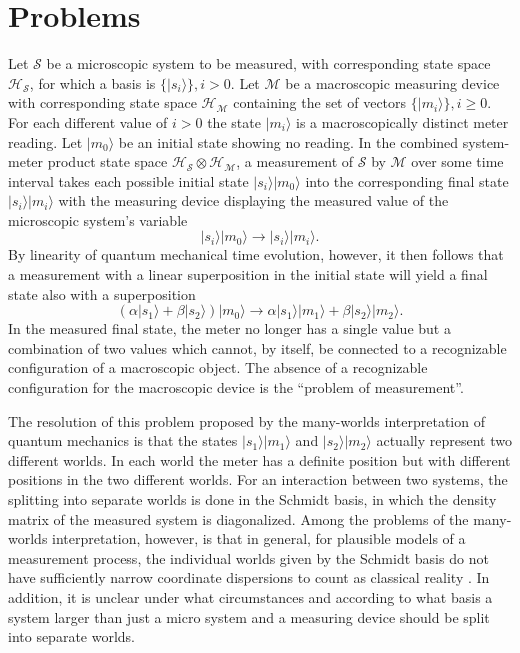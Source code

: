 \documentclass[twocolumn,amsmath,amssymb]{revtex4-1}
\begin{document}
\section{\label{sec:problems}Problems}
Let $\mathcal{S}$ be a microscopic system to be measured, with corresponding state space $\mathcal{H}_\mathcal{S}$,
for which a basis is $\{|s_i \rangle \}, i > 0$.
Let $\mathcal{M}$ be a macroscopic measuring device with corresponding state space $\mathcal{H}_\mathcal{M}$
containing the set of vectors $\{ |m_i \rangle \}, i \geq 0$.  For each different value of $i > 0$ the state $|m_i \rangle $ is 
a macroscopically distinct meter reading.
Let $|m_0 \rangle $ be an initial state showing no reading. In the 
combined system-meter product state space 
$\mathcal{H}_\mathcal{S} \otimes \mathcal{H}_\mathcal{M}$, a 
measurement of $\mathcal{S}$ by $\mathcal{M}$ over some time interval
takes each possible initial state $|s_i \rangle  |m_0 \rangle $ into the corresponding final state $|s_i \rangle |m_i \rangle $
with the measuring device displaying the measured value of the microscopic system's variable
\begin{equation}
|s_i \rangle  |m_0 \rangle  \rightarrow |s_i \rangle  |m_i \rangle .
\end{equation}
By linearity of quantum mechanical time evolution, however, it then follows that a measurement
with a linear superposition in the initial state will yield a final state also with a superposition
\begin{equation}
(\alpha|s_1 \rangle  + \beta|s_2 \rangle ) |m_0 \rangle  \rightarrow 
\alpha |s_1 \rangle  |m_1 \rangle  + \beta|s_2 \rangle  |m_2 \rangle . 
\end{equation}
In the measured final state, the meter no longer has a single value but a
combination of two values which cannot, by itself,  be connected to a recognizable configuration of a macroscopic object.
The absence of a recognizable configuration for the macroscopic device is the ``problem of measurement''.

The resolution of this problem proposed by the many-worlds interpretation of quantum mechanics \cite{ Everett, DeWitt} 
is that the states $|s_1 \rangle  |m_1 \rangle $ and $|s_2 \rangle  |m_2 \rangle $ actually represent two different worlds. In each world the 
meter has a definite position but with different positions in the two different worlds. For an interaction
between two systems, the splitting into separate worlds is done in the Schmidt basis, in which the density 
matrix of the measured system is diagonalized.  Among the problems of the many-worlds interpretation, however,
is that in general, for plausible models of a measurement process, 
the individual worlds given by the Schmidt basis do not have sufficiently narrow coordinate dispersions to count as classical reality \cite{Page}.  In addition, it is unclear under
what circumstances and according to what basis a system larger than just a micro system and a measuring 
device should be split into separate worlds.
\end{document}
